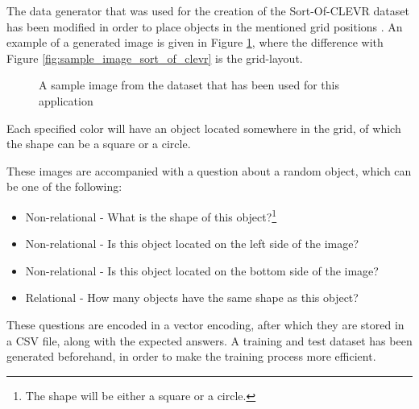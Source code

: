 \documentclass[english]{sobraep}
\begin{document}
The data generator that was used for the creation of the Sort-Of-CLEVR dataset has been modified in order to place objects in the mentioned grid positions \cite{sort_of_clevr_dataset}. An example of a generated image is given in Figure \ref{fig:sample_image_own_dataset}, where the difference with Figure \ref{fig:sample_image_sort_of_clevr} is the grid-layout.

\begin{figure}[htp]
    \begin{center}
    \captionsetup{justification=centering}
    \caption{A sample image from the dataset that has been used for this application}
    \label{fig:sample_image_own_dataset}
    \end{center}
\end{figure}

Each specified color will have an object located somewhere in the grid, of which the shape can be a square or a circle.

These images are accompanied with a question about a random object, which can be one of the following:
\begin{itemize}
    \item Non-relational - What is the shape of this object?\footnote{The shape will be either a square or a circle.}
    \item Non-relational - Is this object located on the left side of the image?
    \item Non-relational - Is this object located on the bottom side of the image?
    \item Relational - How many objects have the same shape as this object?
\end{itemize}

These questions are encoded in a vector encoding, after which they are stored in a CSV file, along with the expected answers. A training and test dataset has been generated beforehand, in order to make the training process more efficient. 
\end{document}
